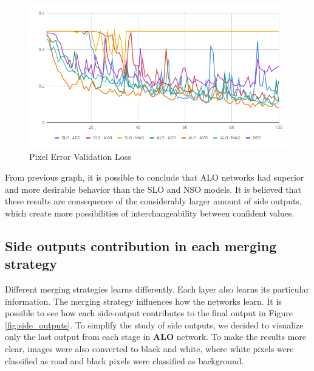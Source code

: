\begin{figure}
  \caption{Pixel Error Validation Loss  }
  \centering
    \includegraphics[width=1.\columnwidth]{figures/falreis/pixel_error.png}
  
  \label{fig:validation_accuracy_pixel_error}
\end{figure}

From previous graph, it is possible to conclude that ALO networks had superior and more desirable behavior than the SLO and NSO models. It is believed that these results are consequence of the considerably larger amount of side outputs, which create more possibilities of interchangeability between confident values.

\subsection{Side outputs contribution in each merging strategy}
\label{ssec:merging_learn}

Different merging strategies learns differently. Each layer also learns its particular information. The merging strategy influences how the networks learn. It is possible to see how each side-output contributes to the final output in Figure \ref{fig:side_outputs}. To simplify the study of side outputs, we decided to visualize only the last  output from each stage in \textbf{ALO} network. To make the results more clear, images were also converted to black and white, where white pixels were classified as road and black pixels were classified as background.
 

